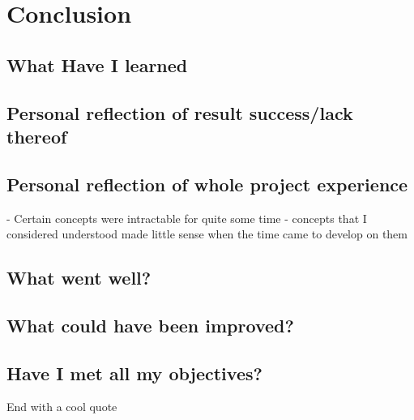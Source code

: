\chapter{Conclusion}

\section{What Have I learned}


\section{Personal reflection of result success/lack thereof}

\section{Personal reflection of whole project experience}
 - Certain concepts were intractable for quite some time 
 - concepts that I considered understood made little sense when the time came to
 develop on them 



\section{What went well?}

\section{What could have been improved?}

\section{Have I met all my objectives?}

End with a cool quote